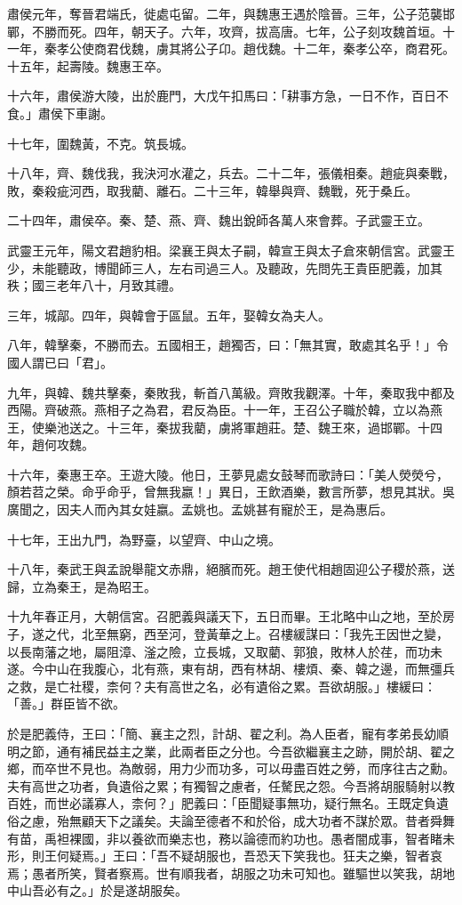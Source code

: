 \begin{pinyinscope}
肅侯元年，奪晉君端氏，徙處屯留。二年，與魏惠王遇於陰晉。三年，公子范襲邯鄲，不勝而死。四年，朝天子。六年，攻齊，拔高唐。七年，公子刻攻魏首垣。十一年，秦孝公使商君伐魏，虜其將公子卬。趙伐魏。十二年，秦孝公卒，商君死。十五年，起壽陵。魏惠王卒。

十六年，肅侯游大陵，出於鹿門，大戊午扣馬曰：「耕事方急，一日不作，百日不食。」肅侯下車謝。

十七年，圍魏黃，不克。筑長城。

十八年，齊、魏伐我，我決河水灌之，兵去。二十二年，張儀相秦。趙疵與秦戰，敗，秦殺疵河西，取我藺、離石。二十三年，韓舉與齊、魏戰，死于桑丘。

二十四年，肅侯卒。秦、楚、燕、齊、魏出銳師各萬人來會葬。子武靈王立。

武靈王元年，陽文君趙豹相。梁襄王與太子嗣，韓宣王與太子倉來朝信宮。武靈王少，未能聽政，博聞師三人，左右司過三人。及聽政，先問先王貴臣肥義，加其秩；國三老年八十，月致其禮。

三年，城鄗。四年，與韓會于區鼠。五年，娶韓女為夫人。

八年，韓擊秦，不勝而去。五國相王，趙獨否，曰：「無其實，敢處其名乎！」令國人謂已曰「君」。

九年，與韓、魏共擊秦，秦敗我，斬首八萬級。齊敗我觀澤。十年，秦取我中都及西陽。齊破燕。燕相子之為君，君反為臣。十一年，王召公子職於韓，立以為燕王，使樂池送之。十三年，秦拔我藺，虜將軍趙莊。楚、魏王來，過邯鄲。十四年，趙何攻魏。

十六年，秦惠王卒。王遊大陵。他日，王夢見處女鼓琴而歌詩曰：「美人熒熒兮，顏若苕之榮。命乎命乎，曾無我嬴！」異日，王飲酒樂，數言所夢，想見其狀。吳廣聞之，因夫人而內其女娃嬴。孟姚也。孟姚甚有寵於王，是為惠后。

十七年，王出九門，為野臺，以望齊、中山之境。

十八年，秦武王與孟說舉龍文赤鼎，絕臏而死。趙王使代相趙固迎公子稷於燕，送歸，立為秦王，是為昭王。

十九年春正月，大朝信宮。召肥義與議天下，五日而畢。王北略中山之地，至於房子，遂之代，北至無窮，西至河，登黃華之上。召樓緩謀曰：「我先王因世之變，以長南藩之地，屬阻漳、滏之險，立長城，又取藺、郭狼，敗林人於荏，而功未遂。今中山在我腹心，北有燕，東有胡，西有林胡、樓煩、秦、韓之邊，而無彊兵之救，是亡社稷，柰何？夫有高世之名，必有遺俗之累。吾欲胡服。」樓緩曰：「善。」群臣皆不欲。

於是肥義侍，王曰：「簡、襄主之烈，計胡、翟之利。為人臣者，寵有孝弟長幼順明之節，通有補民益主之業，此兩者臣之分也。今吾欲繼襄主之跡，開於胡、翟之鄉，而卒世不見也。為敵弱，用力少而功多，可以毋盡百姓之勞，而序往古之勳。夫有高世之功者，負遺俗之累；有獨智之慮者，任驁民之怨。今吾將胡服騎射以教百姓，而世必議寡人，柰何？」肥義曰：「臣聞疑事無功，疑行無名。王既定負遺俗之慮，殆無顧天下之議矣。夫論至德者不和於俗，成大功者不謀於眾。昔者舜舞有苗，禹袒裸國，非以養欲而樂志也，務以論德而約功也。愚者闇成事，智者睹未形，則王何疑焉。」王曰：「吾不疑胡服也，吾恐天下笑我也。狂夫之樂，智者哀焉；愚者所笑，賢者察焉。世有順我者，胡服之功未可知也。雖驅世以笑我，胡地中山吾必有之。」於是遂胡服矣。


\end{pinyinscope}
